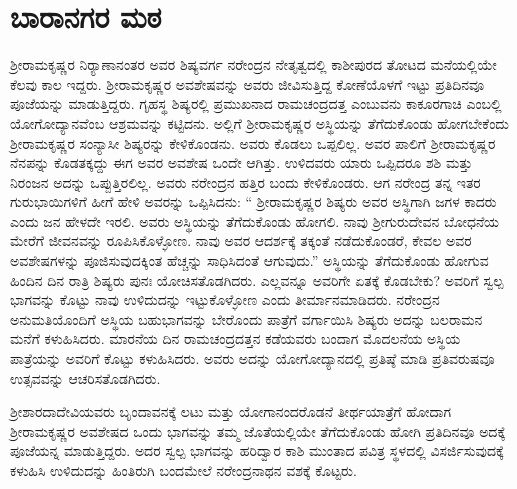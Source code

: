 
\chapter{ಬಾರಾನಗರ ಮಠ }

ಶ‍್ರೀರಾಮಕೃಷ್ಣರ ನಿರ‍್ಯಾಣಾನಂತರ ಅವರ ಶಿಷ್ಯವರ್ಗ ನರೇಂದ್ರನ ನೇತೃತ್ವದಲ್ಲಿ ಕಾಶೀಪುರದ ತೋಟದ ಮನೆಯಲ್ಲಿಯೇ ಕೆಲವು ಕಾಲ ಇದ್ದರು. ಶ‍್ರೀರಾಮಕೃಷ್ಣರ ಅವಶೇಷವನ್ನು ಅವರು ಜೀವಿಸುತ್ತಿದ್ದ ಕೋಣೆಯೊಳಗೆ ಇಟ್ಟು ಪ್ರತಿದಿನವೂ ಪೂಜೆಯನ್ನು ಮಾಡುತ್ತಿದ್ದರು. ಗೃಹಸ್ಥ ಶಿಷ್ಯರಲ್ಲಿ ಪ್ರಮುಖನಾದ ರಾಮಚಂದ್ರದತ್ತ ಎಂಬುವನು ಕಾಕೂರಗಾಚಿ ಎಂಬಲ್ಲಿ ಯೋಗೋದ್ಯಾನವೆಂಬ ಆಶ್ರಮವನ್ನು ಕಟ್ಟಿದನು. ಅಲ್ಲಿಗೆ ಶ‍್ರೀರಾಮಕೃಷ್ಣರ ಅಸ್ಥಿಯನ್ನು ತೆಗೆದುಕೊಂಡು ಹೋಗಬೇಕೆಂದು ಶ‍್ರೀರಾಮಕೃಷ್ಣರ ಸಂನ್ಯಾಸೀ ಶಿಷ್ಯರನ್ನು ಕೇಳಿಕೊಂಡನು. ಅವರು ಕೊಡಲು ಒಪ್ಪಲಿಲ್ಲ. ಅವರ ಪಾಲಿಗೆ ಶ‍್ರೀರಾಮಕೃಷ್ಣರ ನೆನಪನ್ನು ಕೊಡತಕ್ಕದ್ದು ಈಗ ಅವರ ಅವಶೇಷ ಒಂದೇ ಆಗಿತ್ತು. ಉಳಿದವರು ಯಾರು ಒಪ್ಪಿದರೂ ಶಶಿ ಮತ್ತು ನಿರಂಜನ ಅದನ್ನು ಒಪ್ಪುತ್ತಿರಲಿಲ್ಲ. ಅವರು ನರೇಂದ್ರನ ಹತ್ತಿರ ಬಂದು ಕೇಳಿಕೊಂಡರು. ಆಗ ನರೇಂದ್ರ ತನ್ನ ಇತರ ಗುರುಭಾಯಿಗಳಿಗೆ ಹೀಗೆ ಹೇಳಿ ಅವರನ್ನು ಒಪ್ಪಿಸಿದನು: “ ಶ‍್ರೀರಾಮಕೃಷ್ಣರ ಶಿಷ್ಯರು ಅವರ ಅಸ್ಥಿಗಾಗಿ ಜಗಳ ಕಾದರು ಎಂದು ಜನ ಹೇಳದೇ ಇರಲಿ. ಅವರು ಅಸ್ಥಿಯನ್ನು ತೆಗೆದುಕೊಂಡು ಹೋಗಲಿ. ನಾವು ಶ‍್ರೀಗುರುದೇವನ ಬೋಧನೆಯ ಮೇರೆಗೆ ಜೀವನವನ್ನು ರೂಪಿಸಿಕೊಳ್ಳೋಣ. ನಾವು ಅವರ ಆದರ್ಶಕ್ಕೆ ತಕ್ಕಂತೆ ನಡೆದುಕೊಂಡರೆ, ಕೇವಲ ಅವರ ಅವಶೇಷಗಳನ್ನು ಪೂಜಿಸುವುದಕ್ಕಿಂತ ಹೆಚ್ಚನ್ನು ಸಾಧಿಸಿದಂತೆ ಆಗುವುದು.” ಅಸ್ಥಿಯನ್ನು ತೆಗೆದುಕೊಂಡು ಹೋಗುವ ಹಿಂದಿನ ದಿನ ರಾತ್ರಿ ಶಿಷ್ಯರು ಪುನಃ ಯೋಚಿಸತೊಡಗಿದರು. ಎಲ್ಲವನ್ನೂ ಅವರಿಗೇ ಏತಕ್ಕೆ ಕೊಡಬೇಕು? ಅವರಿಗೆ ಸ್ವಲ್ಪ ಭಾಗವನ್ನು ಕೊಟ್ಟು ನಾವು ಉಳಿದುದನ್ನು ಇಟ್ಟುಕೊಳ್ಳೋಣ ಎಂದು ತೀರ್ಮಾನಮಾಡಿದರು. ನರೇಂದ್ರನ ಅನುಮತಿಯೊಂದಿಗೆ ಅಸ್ಥಿಯ ಬಹುಭಾಗವನ್ನು ಬೇರೊಂದು ಪಾತ್ರೆಗೆ ವರ್ಗಾಯಿಸಿ ಶಿಷ್ಯರು ಅದನ್ನು ಬಲರಾಮನ ಮನೆಗೆ ಕಳುಹಿಸಿದರು. ಮಾರನೆಯ ದಿನ ರಾಮಚಂದ್ರದತ್ತನ ಕಡೆಯವರು ಬಂದಾಗ ಮೊದಲನೆಯ ಅಸ್ಥಿಯ ಪಾತ್ರೆಯನ್ನು ಅವರಿಗೆ ಕೊಟ್ಟು ಕಳುಹಿಸಿದರು. ಅವರು ಅದನ್ನು ಯೋಗೋದ್ಯಾನದಲ್ಲಿ ಪ್ರತಿಷ್ಠೆ ಮಾಡಿ ಪ್ರತಿವರುಷವೂ ಉತ್ಸವವನ್ನು ಆಚರಿಸತೊಡಗಿದರು.

ಶ‍್ರೀಶಾರದಾದೇವಿಯವರು ಬೃಂದಾವನಕ್ಕೆ ಲಟು ಮತ್ತು ಯೋಗಾನಂದರೊಡನೆ ತೀರ್ಥಯಾತ್ರೆಗೆ ಹೋದಾಗ ಶ‍್ರೀರಾಮಕೃಷ್ಣರ ಅವಶೇಷದ ಒಂದು ಭಾಗವನ್ನು ತಮ್ಮ ಜೊತೆಯಲ್ಲಿಯೇ ತೆಗೆದುಕೊಂಡು ಹೋಗಿ ಪ್ರತಿದಿನವೂ ಅದಕ್ಕೆ ಪೂಜೆಯನ್ನ ಮಾಡುತ್ತಿದ್ದರು. ಅದರ ಸ್ವಲ್ಪ ಭಾಗವನ್ನು ಹರಿದ್ವಾರ ಕಾಶಿ ಮುಂತಾದ ಪವಿತ್ರ ಸ್ಥಳದಲ್ಲಿ ವಿಸರ್ಜಿಸುವುದಕ್ಕೆ ಕಳುಹಿಸಿ ಉಳಿದುದನ್ನು ಹಿಂತಿರುಗಿ ಬಂದಮೇಲೆ ನರೇಂದ್ರನಾಥನ ವಶಕ್ಕೆ ಕೊಟ್ಟರು.

